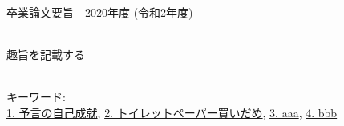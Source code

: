 卒業論文要旨 - 2020年度 (令和2年度)
\begin{center}
\begin{large}
\end{large}
\end{center}

~ \\

趣旨を記載する

~ \\
キーワード:\\
\underline{1. 予言の自己成就},
\underline{2. トイレットペーパー買いだめ},
\underline{3. aaa},
\underline{4. bbb}
\begin{flushright}
\dept \\
\author
\end{flushright}
